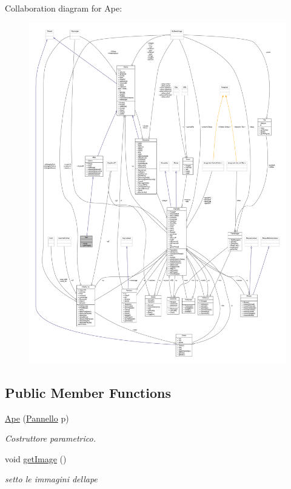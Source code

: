 Collaboration diagram for Ape\+:
\nopagebreak
\begin{figure}[H]
\begin{center}
\leavevmode
\includegraphics[width=350pt]{class_entita_1_1_ape__coll__graph}
\end{center}
\end{figure}
\subsection*{Public Member Functions}
\begin{DoxyCompactItemize}
\item 
\hyperlink{class_entita_1_1_ape_a5c67298368c58376888777816ca421d4}{Ape} (\hyperlink{classa_1_1survival_1_1game_1_1_pannello}{Pannello} p)
\begin{DoxyCompactList}\small\item\em Costruttore parametrico. \end{DoxyCompactList}\item 
void \hyperlink{class_entita_1_1_ape_acd4bd75c24769238f365de299bde96ac}{get\+Image} ()
\begin{DoxyCompactList}\small\item\em setto le immagini dell\textquotesingle{}ape \end{DoxyCompactList}\end{DoxyCompactItemize}

